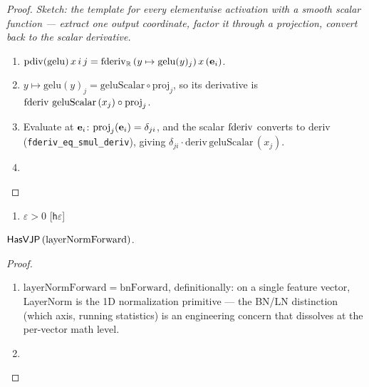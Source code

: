 \begin{proof}
\leanok
\emph{Sketch: the template for every elementwise activation with a
smooth scalar function --- extract one output coordinate, factor it
through a projection, convert back to the scalar derivative.}
\begin{enumerate}
  \item \(\operatorname{pdiv}(\mathrm{gelu})\, x\, i\, j
          = \operatorname{fderiv}_{\mathbb{R}}\,(y \mapsto \mathrm{gelu}(y)_j)\, x\, (\mathbf{e}_i)\).
  \item \(y \mapsto \mathrm{gelu}(y)_j
          = \mathrm{geluScalar} \circ \mathrm{proj}_j\), so its
    derivative is
    \(\operatorname{fderiv}\,\mathrm{geluScalar}\,(x_j) \circ \mathrm{proj}_j\).
  \item Evaluate at \(\mathbf{e}_i\):
    \(\mathrm{proj}_j(\mathbf{e}_i) = \delta_{ji}\), and the scalar
    \(\operatorname{fderiv}\) converts to \(\mathrm{deriv}\)
    (\texttt{fderiv\_eq\_smul\_deriv}), giving
    \(\delta_{ji} \cdot \mathrm{deriv}\,\mathrm{geluScalar}\,(x_j)\).
  \item \Qed{}
\end{enumerate}
\end{proof}

\begin{theorem}
  \label{thm:layerNormHasVJP}
  \leanok
  \Assume{}
  \begin{enumerate}
    \item \(\varepsilon > 0\) \hfill[\texttt{h\(\varepsilon\)}]
  \end{enumerate}
  \Prove{} \(\mathsf{HasVJP}\, (\mathrm{layerNormForward})\).
\end{theorem}

\begin{proof}
\leanok
\begin{enumerate}
  \item \(\mathrm{layerNormForward} = \mathrm{bnForward}\),
    definitionally: on a single feature vector, LayerNorm is
    the 1D normalization primitive --- the BN/LN distinction (which
    axis, running statistics) is an engineering concern that
    dissolves at the per-vector math level.
  \item \Qed{}
\end{enumerate}
\end{proof}

